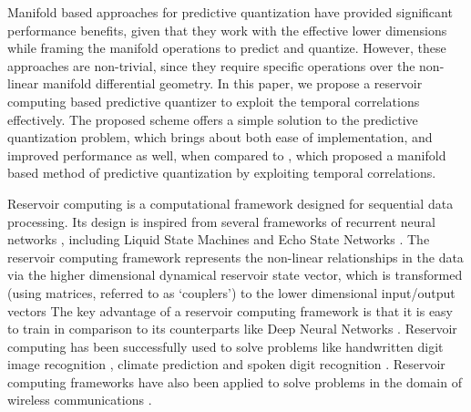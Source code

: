 \documentclass[conference]{IEEEtran}
\begin{document}
Manifold based approaches for predictive quantization have provided significant performance benefits, given that they work with the effective lower dimensions while framing the manifold operations to predict and quantize.
However, these approaches are non-trivial, since they require specific operations over the non-linear manifold differential geometry.
In this paper, we propose a reservoir computing based predictive quantizer to exploit the temporal correlations effectively.
The proposed scheme offers a simple solution to the predictive quantization problem, which brings about both ease of implementation, and improved performance as well, when compared to \cite{6891198}, which proposed a manifold based method of predictive quantization by exploiting temporal correlations.

{
Reservoir computing is a computational framework designed for sequential data processing.
Its design is inspired from several frameworks of recurrent neural networks \cite{jaeger2004harnessing}, including Liquid State Machines \cite{jalalvand2015real} and Echo State Networks \cite{mosleh2017brain,pathak2017using}.
The reservoir computing framework represents the non-linear relationships in the data via the higher dimensional dynamical reservoir state vector, which is transformed (using
matrices, referred to as `couplers') to the lower dimensional input/output vectors
The key advantage of a reservoir computing framework is that it is easy to train in comparison to its counterparts like Deep Neural Networks \cite{mosleh2017brain}.
Reservoir computing has been successfully used to solve problems like handwritten digit image recognition \cite{jalalvand2015real}, climate prediction \cite{pathak2017using} and spoken digit recognition \cite{verstraeten2005isolated}.
}
Reservoir computing frameworks have also been applied to solve problems in the domain of wireless communications \cite{jaeger2004harnessing,mosleh2017brain,shafin2018realizing}.
\end{document}
